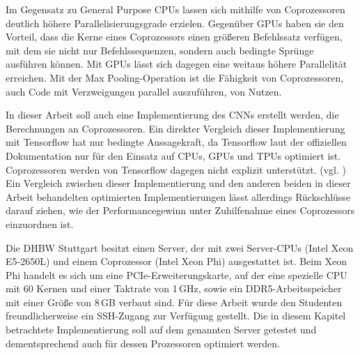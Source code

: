\documentclass[../main.tex]{subfiles}
\begin{document}
Im Gegensatz zu General Purpose CPUs lassen sich mithilfe von Coprozessoren deutlich höhere Parallelisierungsgrade erzielen. Gegenüber GPUs haben sie den Vorteil, dass die Kerne eines Coprozessors einen größeren Befehlssatz verfügen, mit dem sie nicht nur Befehlssequenzen, sondern auch bedingte Sprünge ausführen können. Mit GPUs lässt sich dagegen eine weitaus höhere Parallelität erreichen. Mit der Max Pooling-Operation ist die Fähigkeit von Coprozessoren, auch Code mit Verzweigungen parallel auszuführen, von Nutzen. 

In dieser Arbeit soll auch eine Implementierung des CNNs erstellt werden, die Berechnungen an Coprozessoren. Ein direkter Vergleich dieser Implementierung mit Tensorflow hat nur bedingte Aussagekraft, da Tensorflow laut der offiziellen Dokumentation nur für den Einsatz auf CPUs, GPUs und TPUs optimiert ist. Coprozessoren werden von Tensorflow dagegen nicht explizit unterstützt. (vgl. \cite{aboutTensorflow}) Ein Vergleich zwischen dieser Implementierung und den anderen beiden in dieser Arbeit behandelten optimierten Implementierungen lässt allerdings Rückschlüsse darauf ziehen, wie der Performancegewinn unter Zuhilfenahme eines Coprozessors einzuordnen ist. 

Die DHBW Stuttgart besitzt einen Server, der mit zwei Server-CPUs (Intel Xeon E5-2650L) und einem Coprozessor (Intel Xeon Phi) ausgestattet ist. Beim Xeon Phi handelt es sich um eine PCIe-Erweiterungskarte, auf der eine spezielle CPU mit 60 Kernen und einer Taktrate von 1\,GHz, sowie ein DDR5-Arbeitsspeicher mit einer Größe von 8\,GB verbaut sind. Für diese Arbeit wurde den Studenten freundlicherweise ein SSH-Zugang zur Verfügung gestellt. Die in diesem Kapitel betrachtete Implementierung soll auf dem genannten Server getestet und dementsprechend auch für dessen Prozessoren optimiert werden. 
\end{document}
